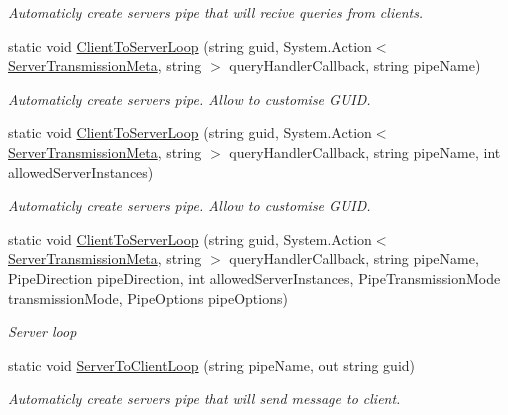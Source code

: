 \begin{DoxyCompactItemize}
\begin{DoxyCompactList}\small\item\em Automaticly create server\textquotesingle{}s pipe that will recive queries from clients. \end{DoxyCompactList}\item 
static void \mbox{\hyperlink{class_pipes_provider_1_1_a_p_i_a06ee04a0e80238a176b7b2cac3f6bb4b}{Client\+To\+Server\+Loop}} (string guid, System.\+Action$<$ \mbox{\hyperlink{class_pipes_provider_1_1_server_transmission_meta}{Server\+Transmission\+Meta}}, string $>$ query\+Handler\+Callback, string pipe\+Name)
\begin{DoxyCompactList}\small\item\em Automaticly create server\textquotesingle{}s pipe. Allow to customise G\+U\+ID. \end{DoxyCompactList}\item 
static void \mbox{\hyperlink{class_pipes_provider_1_1_a_p_i_a740e60d5cfd04fcc434e05b40910e493}{Client\+To\+Server\+Loop}} (string guid, System.\+Action$<$ \mbox{\hyperlink{class_pipes_provider_1_1_server_transmission_meta}{Server\+Transmission\+Meta}}, string $>$ query\+Handler\+Callback, string pipe\+Name, int allowed\+Server\+Instances)
\begin{DoxyCompactList}\small\item\em Automaticly create server\textquotesingle{}s pipe. Allow to customise G\+U\+ID. \end{DoxyCompactList}\item 
static void \mbox{\hyperlink{class_pipes_provider_1_1_a_p_i_a9eacd5177e24badabe5ac8a3fe30d5d3}{Client\+To\+Server\+Loop}} (string guid, System.\+Action$<$ \mbox{\hyperlink{class_pipes_provider_1_1_server_transmission_meta}{Server\+Transmission\+Meta}}, string $>$ query\+Handler\+Callback, string pipe\+Name, Pipe\+Direction pipe\+Direction, int allowed\+Server\+Instances, Pipe\+Transmission\+Mode transmission\+Mode, Pipe\+Options pipe\+Options)
\begin{DoxyCompactList}\small\item\em Server loop \end{DoxyCompactList}\item 
static void \mbox{\hyperlink{class_pipes_provider_1_1_a_p_i_a793d388ee138476bcea3256146851432}{Server\+To\+Client\+Loop}} (string pipe\+Name, out string guid)
\begin{DoxyCompactList}\small\item\em Automaticly create server\textquotesingle{}s pipe that will send message to client. \end{DoxyCompactList}\item 

\end{DoxyCompactItemize}
